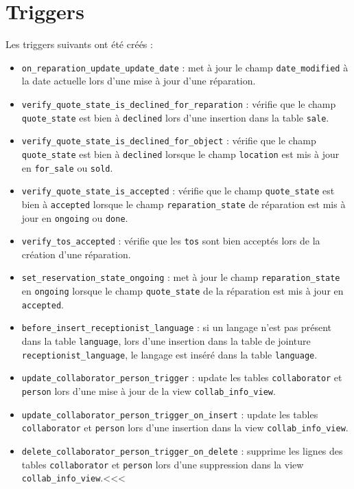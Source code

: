 \documentclass{article}
\newcommand{\ttt}{\texttt}
\begin{document}
    \section{Triggers}

    Les triggers suivants ont été créés :
    \begin{itemize}
        \item \ttt{on\_reparation\_update\_update\_date} : met à jour le champ \ttt{date\_modified} à la date actuelle lors d'une mise à jour d'une réparation.
        \item \ttt{verify\_quote\_state\_is\_declined\_for\_reparation} : vérifie que le champ \ttt{quote\_state} est bien à \ttt{declined} lors d'une insertion dans la table \ttt{sale}.
        \item \ttt{verify\_quote\_state\_is\_declined\_for\_object} : vérifie que le champ \ttt{quote\_state} est bien à \ttt{declined} lorsque le champ \ttt{location} est mis à jour en \ttt{for\_sale} ou \ttt{sold}.
        \item \ttt{verify\_quote\_state\_is\_accepted} : vérifie que le champ \ttt{quote\_state} est bien à \ttt{accepted} lorsque le champ \ttt{reparation\_state} de réparation est mis à jour en \ttt{ongoing} ou \ttt{done}.
        \item \ttt{verify\_tos\_accepted} : vérifie que les \ttt{tos} sont bien acceptés lors de la création d'une réparation.
        \item \ttt{set\_reservation\_state\_ongoing} : met à jour le champ \ttt{reparation\_state} en \ttt{ongoing} lorsque le champ \ttt{quote\_state} de la réparation est mis à jour en \ttt{accepted}.
        \item \ttt{before\_insert\_receptionist\_language} : si un langage n'est pas présent dans la table \ttt{language}, lors d'une insertion dans la table de jointure \ttt{receptionist\_language}, le langage est inséré dans la table \ttt{language}.
        \item \ttt{update\_collaborator\_person\_trigger} : update les tables \ttt{collaborator} et \ttt{person} lors d'une mise à jour de la view \ttt{collab\_info\_view}.
        \item \ttt{update\_collaborator\_person\_trigger\_on\_insert} : update les tables \ttt{collaborator} et \ttt{person} lors d'une insertion dans la view \ttt{collab\_info\_view}.
        \item \ttt{delete\_collaborator\_person\_trigger\_on\_delete} : supprime les lignes des tables \ttt{collaborator} et \ttt{person} lors d'une suppression dans la view \ttt{collab\_info\_view}.<<<

\end{itemize}
\end{document}
